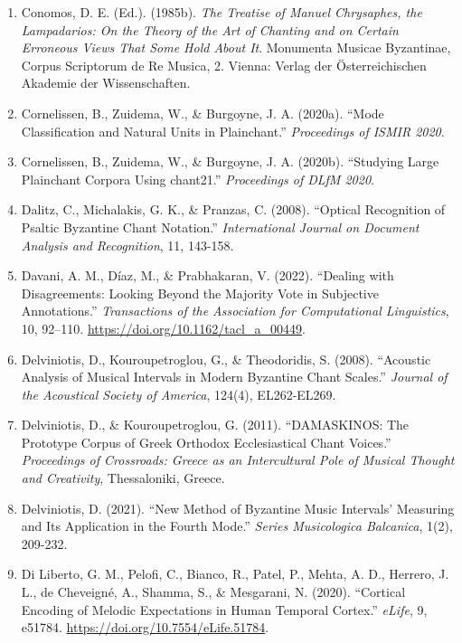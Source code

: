 \documentclass[11pt,a4paper]{article}
\begin{document}
\begin{enumerate}
 Conomos, D. E. (1985a). \emph{The Late Byzantine and Slavonic Communion Cycle: Liturgy and Music}. Dumbarton Oaks Studies 21. Washington, DC: Dumbarton Oaks Research Library and Collection.
\item
 Conomos, D. E. (Ed.). (1985b). \emph{The Treatise of Manuel Chrysaphes, the Lampadarios: On the Theory of the Art of Chanting and on Certain Erroneous Views That Some Hold About It}. Monumenta Musicae Byzantinae, Corpus Scriptorum de Re Musica, 2. Vienna: Verlag der Österreichischen Akademie der Wissenschaften.
\item
 Cornelissen, B., Zuidema, W., \& Burgoyne, J. A. (2020a). ``Mode Classification and Natural Units in Plainchant.'' \emph{Proceedings of ISMIR 2020}.
\item
 Cornelissen, B., Zuidema, W., \& Burgoyne, J. A. (2020b). ``Studying Large Plainchant Corpora Using chant21.'' \emph{Proceedings of DLfM 2020}.
\item
 Dalitz, C., Michalakis, G. K., \& Pranzas, C. (2008). ``Optical Recognition of Psaltic Byzantine Chant Notation.'' \emph{International Journal on Document Analysis and Recognition}, 11, 143-158.
\item
 Davani, A. M., Díaz, M., \& Prabhakaran, V. (2022). ``Dealing with Disagreements: Looking Beyond the Majority Vote in Subjective Annotations.'' \emph{Transactions of the Association for Computational Linguistics}, 10, 92--110. \url{https://doi.org/10.1162/tacl_a_00449}.
\item
 Delviniotis, D., Kouroupetroglou, G., \& Theodoridis, S. (2008). ``Acoustic Analysis of Musical Intervals in Modern Byzantine Chant Scales.'' \emph{Journal of the Acoustical Society of America}, 124(4), EL262-EL269.
\item
 Delviniotis, D., \& Kouroupetroglou, G. (2011). ``DAMASKINOS: The Prototype Corpus of Greek Orthodox Ecclesiastical Chant Voices.'' \emph{Proceedings of Crossroads: Greece as an Intercultural Pole of Musical Thought and Creativity}, Thessaloniki, Greece.
\item
 Delviniotis, D. (2021). ``New Method of Byzantine Music Intervals' Measuring and Its Application in the Fourth Mode.'' \emph{Series Musicologica Balcanica}, 1(2), 209-232.
\item
 Di Liberto, G. M., Pelofi, C., Bianco, R., Patel, P., Mehta, A. D., Herrero, J. L., de Cheveign\'{e}, A., Shamma, S., \& Mesgarani, N. (2020). ``Cortical Encoding of Melodic Expectations in Human Temporal Cortex.'' \emph{eLife}, 9, e51784. \url{https://doi.org/10.7554/eLife.51784}.

\end{enumerate}
\end{document}
